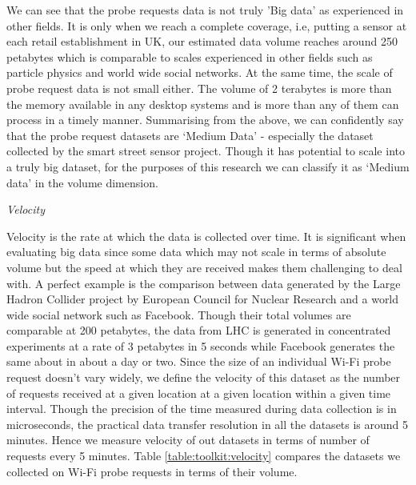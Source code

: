 
We can see that the probe requests data is not truly 'Big data' as experienced in other fields.
It is only when we reach a complete coverage, i.e, putting a sensor at each retail establishment in UK, our estimated data volume reaches around 250 petabytes which is comparable to scales experienced in other fields such as particle physics and world wide social networks.
At the same time, the scale of probe request data is not small either.
The volume of 2 terabytes is more than the memory available in any desktop systems and is more than any of them can process in a timely manner.
Summarising from the above, we can confidently say that the probe request datasets are `Medium Data' - especially the dataset collected by the smart street sensor project.
Though it has potential to scale into a truly big dataset, for the purposes of this research we can classify it as `Medium data' in the volume dimension.


\vspace{1.5em}\noindent\textit{Velocity}\vspace{0.5em}

Velocity is the rate at which the data is collected over time.
It is significant when evaluating big data since some data which may not scale in terms of absolute volume but the speed at which they are received makes them challenging to deal with.
A perfect example is the comparison between data generated by the Large Hadron Collider project by European Council for Nuclear Research and a world wide social network such as Facebook.
Though their total volumes are comparable at 200 petabytes, the data from LHC is generated in concentrated experiments at a rate of 3 petabytes in 5 seconds while Facebook generates the same about in about a day or two.
Since the size of an individual Wi-Fi probe request doesn't vary widely, we define the velocity of this dataset as the number of requests received at a given location at a given location within a given time interval.
Though the precision of the time measured during data collection is in microseconds, the practical data transfer resolution in all the datasets is around 5 minutes.
Hence we measure velocity of out datasets in terms of number of requests every 5 minutes.
Table \ref{table:toolkit:velocity} compares the datasets we collected on Wi-Fi probe requests in terms of their volume.

